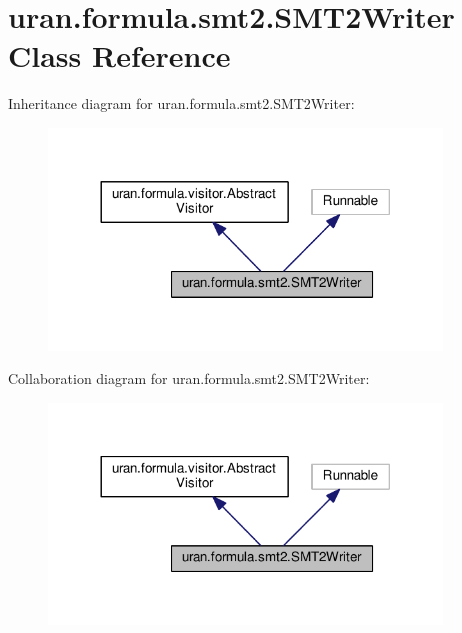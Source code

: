 \hypertarget{classuran_1_1formula_1_1smt2_1_1_s_m_t2_writer}{}\section{uran.\+formula.\+smt2.\+S\+M\+T2\+Writer Class Reference}
\label{classuran_1_1formula_1_1smt2_1_1_s_m_t2_writer}


Inheritance diagram for uran.\+formula.\+smt2.\+S\+M\+T2\+Writer\+:
\nopagebreak
\begin{figure}[H]
\begin{center}
\leavevmode
\includegraphics[width=296pt]{classuran_1_1formula_1_1smt2_1_1_s_m_t2_writer__inherit__graph}
\end{center}
\end{figure}


Collaboration diagram for uran.\+formula.\+smt2.\+S\+M\+T2\+Writer\+:
\nopagebreak
\begin{figure}[H]
\begin{center}
\leavevmode
\includegraphics[width=296pt]{classuran_1_1formula_1_1smt2_1_1_s_m_t2_writer__coll__graph}
\end{center}
\end{figure}
